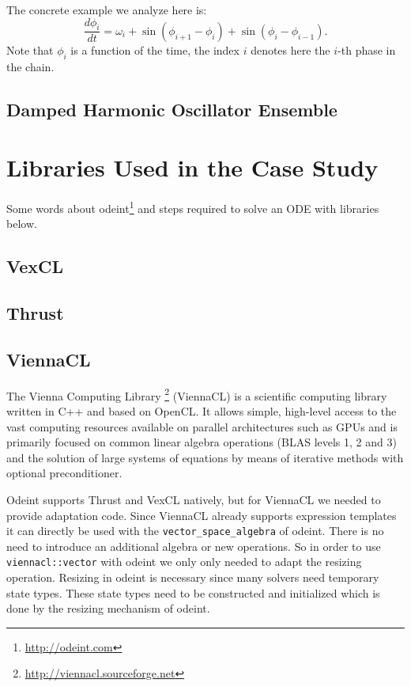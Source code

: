 \documentclass[1p]{elsarticle}
\newcommand{\code}[1]{\lstinline|#1|}
\begin{document}
The concrete example we analyze here is:
\begin{equation}
    \frac{d\phi_i}{dt} = \omega_i + \sin( \phi_{i+1} - \phi_i) + \sin( \phi_i
    - \phi_{i-1}).
\end{equation}
Note that $\phi_i$ is a function of the time, the index $i$ denotes here the
$i$-th phase in the chain.

\subsection{Damped Harmonic Oscillator Ensemble}

\section{Libraries Used in the Case Study}

Some words about odeint\footnote{\href{http://odeint.com}{http://odeint.com}}
and steps required to solve an ODE with libraries below.

\subsection{VexCL}
\subsection{Thrust}
\subsection{ViennaCL}

The Vienna Computing Library%
\footnote{\href{http://viennacl.sourceforge.net}{http://viennacl.sourceforge.net}}
(ViennaCL) is a scientific computing library written in C++ and based on
OpenCL. It allows simple, high-level access to the vast computing resources
available on parallel architectures such as GPUs and is primarily focused on
common linear algebra operations (BLAS levels 1, 2 and 3) and the solution of
large systems of equations by means of iterative methods with optional
preconditioner.

Odeint supports Thrust and VexCL natively, but for ViennaCL we needed to
provide adaptation code. Since ViennaCL already supports expression templates
it can directly be used with the \code{vector_space_algebra} of odeint. There
is no need to introduce an additional algebra or new operations. So in order to
use \code{viennacl::vector} with odeint we only only needed to adapt the
resizing operation. Resizing in odeint is necessary since many solvers need
temporary state types. These state types need to be constructed and initialized
which is done by the resizing mechanism of odeint.
\end{document}
